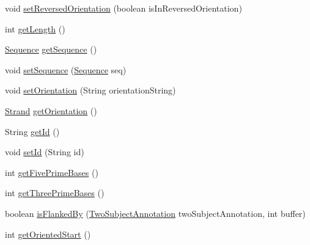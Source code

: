 \begin{DoxyCompactItemize}
\item 
void \hyperlink{interfacebroad_1_1core_1_1annotation_1_1_genomic_annotation_a01defdbb20c34c88e500ad4009cb4d30}{set\+Reversed\+Orientation} (boolean is\+In\+Reversed\+Orientation)
\item 
int \hyperlink{interfacebroad_1_1core_1_1annotation_1_1_genomic_annotation_a0b276757bb75b768a6c6a266a9daa96d}{get\+Length} ()
\item 
\hyperlink{classbroad_1_1core_1_1sequence_1_1_sequence}{Sequence} \hyperlink{interfacebroad_1_1core_1_1annotation_1_1_genomic_annotation_ae913593fc234e211b353d1bd6b475728}{get\+Sequence} ()
\item 
void \hyperlink{interfacebroad_1_1core_1_1annotation_1_1_genomic_annotation_a7f3133b1de941460bb22c6d2d3bd64a5}{set\+Sequence} (\hyperlink{classbroad_1_1core_1_1sequence_1_1_sequence}{Sequence} seq)
\item 
void \hyperlink{interfacebroad_1_1core_1_1annotation_1_1_genomic_annotation_a6155b08fe0145a5ca451a4f49b18d167}{set\+Orientation} (String orientation\+String)
\item 
\hyperlink{enumumms_1_1core_1_1annotation_1_1_annotation_1_1_strand}{Strand} \hyperlink{interfacebroad_1_1core_1_1annotation_1_1_genomic_annotation_a36373aa2575e846905204c09bf74f041}{get\+Orientation} ()
\item 
String \hyperlink{interfacebroad_1_1core_1_1annotation_1_1_genomic_annotation_a8a46707d926ff0aa1fa0104acc74358a}{get\+Id} ()
\item 
void \hyperlink{interfacebroad_1_1core_1_1annotation_1_1_genomic_annotation_aeaa90b7ee4396fe088f38ab2570d8b6f}{set\+Id} (String id)
\item 
int \hyperlink{interfacebroad_1_1core_1_1annotation_1_1_genomic_annotation_a53951d58e6b04312e1ac28d0bb16f23c}{get\+Five\+Prime\+Bases} ()
\item 
int \hyperlink{interfacebroad_1_1core_1_1annotation_1_1_genomic_annotation_af6fe274a67896a3b31bbc7959d1fe185}{get\+Three\+Prime\+Bases} ()
\item 
boolean \hyperlink{interfacebroad_1_1core_1_1annotation_1_1_genomic_annotation_ad4fa97f4e5f130966714abc7398554e9}{is\+Flanked\+By} (\hyperlink{interfacebroad_1_1core_1_1annotation_1_1_two_subject_annotation}{Two\+Subject\+Annotation} two\+Subject\+Annotation, int buffer)
\item 
int \hyperlink{interfacebroad_1_1core_1_1annotation_1_1_genomic_annotation_ac6b1fdda54ca70227d23b707813a247c}{get\+Oriented\+Start} ()

\end{DoxyCompactItemize}
